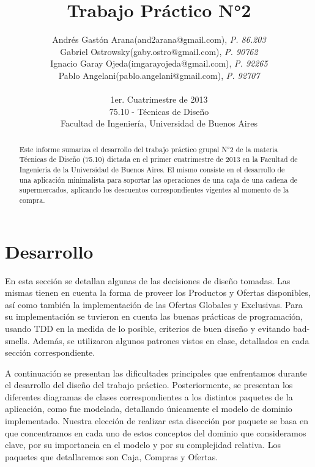 \documentclass[a4paper,11pt]{article}
\title{\textbf{Trabajo Práctico N°2}}
\author{
  Andrés Gastón Arana(and2arana@gmail.com), \textit{P. 86.203}     \\
  Gabriel Ostrowsky(gaby.ostro@gmail.com), \textit{P. 90762}       \\
  Ignacio Garay Ojeda(imgarayojeda@gmail.com), \textit{P. 92265}   \\
  Pablo Angelani(pablo.angelani@gmail.com), \textit{P. 92707}      \\
  \\
  \normalsize{1er. Cuatrimestre de 2013}                           \\
  \normalsize{75.10 - Técnicas de Diseño}                          \\
  \normalsize{Facultad de Ingeniería, Universidad de Buenos Aires}
}
\date{}
\begin{document}
\thispagestyle{empty}
\maketitle

\begin{abstract}

  Este informe sumariza el desarrollo del trabajo práctico grupal N°2 de la
  materia Técnicas de Diseño (75.10) dictada en el primer cuatrimestre de 2013
  en la Facultad de Ingeniería de la Universidad de Buenos Aires. El mismo
  consiste en el desarrollo de una aplicación minimalista para soportar las
  operaciones de una caja de una cadena de supermercados, aplicando los
  descuentos correspondientes vigentes al momento de la compra.

\end{abstract}

\clearpage

\tableofcontents
\clearpage


\part{Desarrollo}

En esta sección se detallan algunas de las decisiones de diseño tomadas. Las
mismas tienen en cuenta la forma de proveer los Productos y Ofertas
disponibles, así como también la implementación de las Ofertas Globales y
Exclusivas.  Para su implementación se tuvieron en cuenta las buenas prácticas
de programación, usando TDD en la medida de lo posible, criterios de buen
diseño y evitando bad-smells.  Además, se utilizaron algunos patrones vistos en
clase, detallados en cada sección correspondiente.

A continuación se presentan las dificultades principales que enfrentamos
durante el desarrollo del diseño del trabajo práctico. Posteriormente, se
presentan los diferentes diagramas de clases correspondientes a los distintos
paquetes de la aplicación, como fue modelada, detallando únicamente el modelo
de dominio implementado. Nuestra elección de realizar esta disección por
paquete se basa en que concentramos en cada uno de estos conceptos del dominio
que consideramos clave, por su importancia en el modelo y por su complejidad
relativa. Los paquetes que detallaremos son Caja, Compras y Ofertas.
\end{document}
